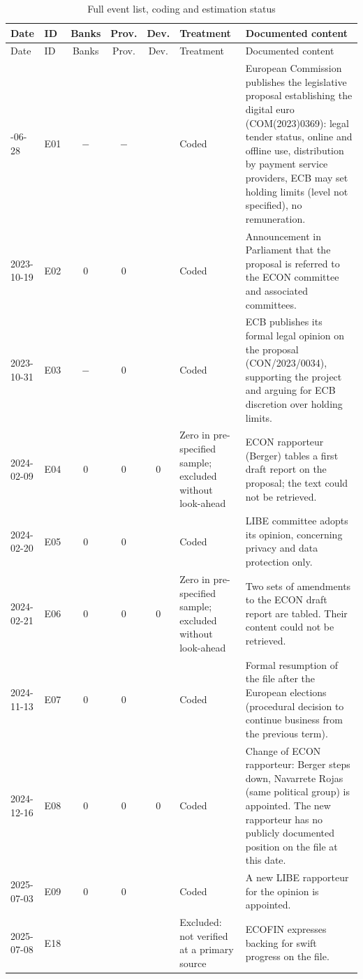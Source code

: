\begin{longtable}{P{1.55cm}P{0.5cm}ccc P{2.6cm} P{6.0cm}}
\caption{Full event list, coding and estimation status}\label{tab:allevents}\\
\toprule Date & ID & Banks & Prov. & Dev. & Treatment & Documented content \\ \midrule
\endfirsthead \toprule Date & ID & Banks & Prov. & Dev. & Treatment & Documented content \\ \midrule \endhead
\bottomrule {}-06-28 & E01 & $-$ & $-$ &  & Coded & European Commission publishes the legislative proposal establishing the digital euro (COM(2023)0369): legal tender status, online and offline use, distribution by payment service providers, ECB may set holding limits (level not specified), no remuneration. \\
2023-10-19 & E02 & $0$ & $0$ &  & Coded & Announcement in Parliament that the proposal is referred to the ECON committee and associated committees. \\
2023-10-31 & E03 & $-$ & $0$ &  & Coded & ECB publishes its formal legal opinion on the proposal (CON/2023/0034), supporting the project and arguing for ECB discretion over holding limits. \\
2024-02-09 & E04 & $0$ & $0$ & $0$ & Zero in pre-specified sample; excluded without look-ahead & ECON rapporteur (Berger) tables a first draft report on the proposal; the text could not be retrieved. \\
2024-02-20 & E05 & $0$ & $0$ &  & Coded & LIBE committee adopts its opinion, concerning privacy and data protection only. \\
2024-02-21 & E06 & $0$ & $0$ & $0$ & Zero in pre-specified sample; excluded without look-ahead & Two sets of amendments to the ECON draft report are tabled. Their content could not be retrieved. \\
2024-11-13 & E07 & $0$ & $0$ &  & Coded & Formal resumption of the file after the European elections (procedural decision to continue business from the previous term). \\
2024-12-16 & E08 & $0$ & $0$ & $0$ & Coded & Change of ECON rapporteur: Berger steps down, Navarrete Rojas (same political group) is appointed. The new rapporteur has no publicly documented position on the file at this date. \\
2025-07-03 & E09 & $0$ & $0$ &  & Coded & A new LIBE rapporteur for the opinion is appointed. \\
2025-07-08 & E18 &  &  &  & Excluded: not verified at a primary source & ECOFIN expresses backing for swift progress on the file. \\

\end{longtable}
